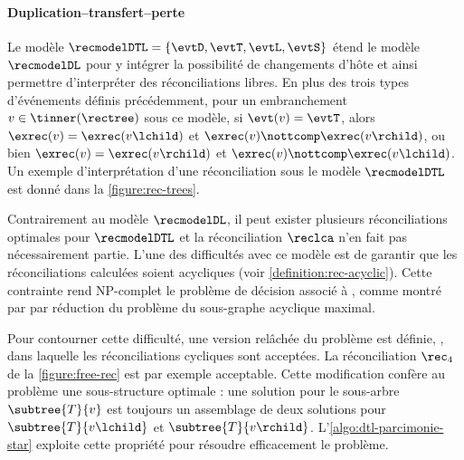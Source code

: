\paragraph{Duplication--transfert--perte~\textup{\parencite{Tofigh2011SimultaneousIdentificationDuplications}}}
Le modèle \(\recmodelDTL = \{\evtD, \evtT, \evtL, \evtS\}\) étend le modèle \(\recmodelDL\) pour y intégrer la possibilité de changements d’hôte et ainsi permettre d’interpréter des réconciliations libres.
En plus des trois types d’événements définis précédemment, pour un embranchement \(v \in \tinner(\rectree)\) sous ce modèle, si \(\evt(v) = \evtT\), alors \(\exrec(v) = \exrec(v\lchild)\) et \(\exrec(v) \nottcomp \exrec(v\rchild)\), ou bien \(\exrec(v) = \exrec(v\rchild)\) et \(\exrec(v) \nottcomp \exrec(v\lchild)\).
Un exemple d’interprétation d’une réconciliation sous le modèle \(\recmodelDTL\) est donné dans la \cref{figure:rec-trees}.

Contrairement au modèle \(\recmodelDL\), il peut exister plusieurs réconciliations optimales pour \(\recmodelDTL\) et la réconciliation \(\reclca\) n’en fait pas nécessairement partie.
L’une des difficultés avec ce modèle est de garantir que les réconciliations calculées soient acycliques (voir \cref{definition:rec-acyclic}).
Cette contrainte rend NP-complet le problème de décision associé à , comme montré par \textcite{Tofigh2011SimultaneousIdentificationDuplications} par réduction du problème du sous-graphe acyclique maximal.

Pour contourner cette difficulté, une version relâchée du problème est définie, , dans laquelle les réconciliations cycliques sont acceptées.
La réconciliation \(\rec_4\) de la \cref{figure:free-rec} est par exemple acceptable.
Cette modification confère au problème une sous-structure optimale : une solution pour le sous-arbre \(\subtree{T}{v}\) est toujours un assemblage de deux solutions pour \(\subtree{T}{v\lchild}\) et \(\subtree{T}{v\rchild}\).
L’\cref{algo:dtl-parcimonie-star} exploite cette propriété pour résoudre efficacement le problème.

